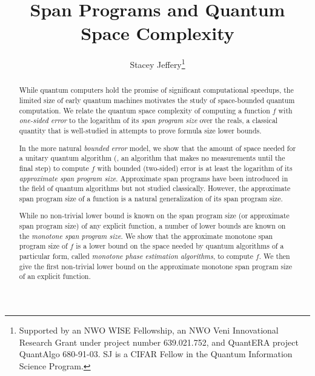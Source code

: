 \documentclass{toc}
\begin{document}
\begin{frontmatter}%

%
%
%

%
%

%
%

\title{Span Programs and Quantum Space Complexity}
%
%
%

%
%
%
%
%
%
%
%
%
%
%
%


%
%
%
%

%

\author[jeffery]{Stacey Jeffery\thanks{Supported by an  NWO  WISE  Fellowship, an NWO Veni Innovational Research Grant under project number 639.021.752, and QuantERA project QuantAlgo 680-91-03. SJ is a CIFAR Fellow in the Quantum Information Science Program.}}
%

%
%
%
%

%
%
%
%
%
%
%
%
\begin{abstract}
  While quantum computers hold the promise of significant computational speedups, the limited size of early quantum machines motivates the study of space-bounded quantum computation. We relate the quantum space complexity of computing a function $f$ with \emph{one-sided error} to the logarithm of its \emph{span program size}  %
over the reals,  %
a classical quantity that is well-studied in attempts to prove formula size lower bounds. 

In the more natural \emph{bounded error} model, we show that the amount of space needed for a unitary quantum algorithm
%
(\ie, an algorithm that makes no measurements until the final step) %
to compute $f$ with bounded (two-sided) error is %
at least   %
the logarithm of its \emph{approximate span program size}. Approximate span programs %
have been  %
introduced in the field of quantum algorithms but not studied classically. However, the approximate span program size of a function is a natural generalization of its span program size. 

While no non-trivial lower bound is known on the span program size (or approximate span program size) of any %
explicit  %
function, a number of lower bounds are known on the \emph{monotone span program size}. We show that the approximate monotone span program size of $f$ is a lower bound on the space needed by quantum algorithms of a particular form, called \emph{monotone phase estimation algorithms}, to compute $f$. We then give the first non-trivial lower bound on the approximate monotone span program size of an explicit function. 
\end{abstract}

%

\end{frontmatter}
\end{document}
